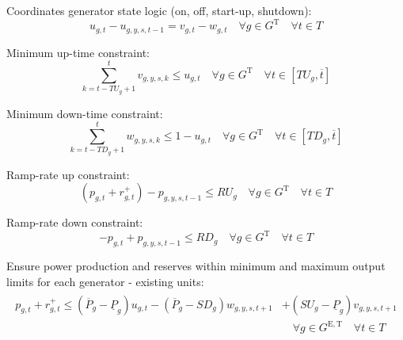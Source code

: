 \documentclass{article}
\newcommand{\sGeneratorsExistingThermal}{G^{\mathrm{E,T}}}
\newcommand{\sGeneratorsThermal}{G^{\mathrm{T}}}
\newcommand{\sIntervals}{T}
\newcommand{\iGenerator}{g}
\newcommand{\iYear}{y}
\newcommand{\iScenario}{s}
\newcommand{\iInterval}{t}
\newcommand{\iIntervalAlias}{k}
\newcommand{\iIntervalTerminal}{\overline{\iInterval}}
\newcommand{\cPowerOutputMax}[1][\iGenerator,\iYear]{\overline{P}_{#1}}
\newcommand{\cUpTimeMin}[1][\iGenerator]{TU_{#1}}
\newcommand{\cDownTimeMin}[1][\iGenerator]{TD_{#1}}
\newcommand{\cRampRateUp}[1][\iGenerator]{RU_{#1}}
\newcommand{\cRampRateDown}[1][\iGenerator]{RD_{#1}}
\newcommand{\cPowerOutputMin}[1][\iGenerator]{\underline{P}_{#1}}
\newcommand{\cRampRateStartup}[1][\iGenerator]{SU_{#1}}
\newcommand{\cRampRateShutdown}[1][\iGenerator]{SD_{#1}}
\newcommand{\vStartupIndicator}[1][\iGenerator,\iInterval]{v_{#1}}
\newcommand{\vShutdownIndicator}[1][\iGenerator,\iInterval]{w_{#1}}
\newcommand{\vReserveUp}[1][\iGenerator,\iInterval]{r^{+}_{#1}}
\newcommand{\vOnIndicator}[1][\iGenerator,\iInterval]{u_{#1}}
\newcommand{\vPower}[1][\iGenerator,\iInterval]{p_{#1}}
\begin{document}
Coordinates generator state logic (on, off, start-up, shutdown):
\begin{equation}
\vOnIndicator - \vOnIndicator[\iGenerator,\iYear,\iScenario,\iInterval-1] = \vStartupIndicator - \vShutdownIndicator \quad \forall \iGenerator \in \sGeneratorsThermal \quad \forall \iInterval \in \sIntervals
\end{equation}

Minimum up-time constraint:
\begin{equation}
\sum\limits_{\iIntervalAlias=\iInterval-\cUpTimeMin + 1}^{\iInterval} \vStartupIndicator[\iGenerator,\iYear,\iScenario,\iIntervalAlias] \leq \vOnIndicator \quad \forall \iGenerator \in \sGeneratorsThermal  \quad \forall \iInterval \in \left[\cUpTimeMin, \iIntervalTerminal \right]
\end{equation}

Minimum down-time constraint:
\begin{equation}
\sum\limits_{\iIntervalAlias=\iInterval-\cDownTimeMin[\iGenerator]+1}^{\iInterval}\vShutdownIndicator[\iGenerator,\iYear,\iScenario,\iIntervalAlias] \leq 1 - \vOnIndicator \quad \forall \iGenerator \in \sGeneratorsThermal  \quad \forall \iInterval \in \left[\cDownTimeMin, \iIntervalTerminal \right]
\end{equation}

Ramp-rate up constraint:
\begin{equation}
\left(\vPower + \vReserveUp\right) - \vPower[\iGenerator,\iYear,\iScenario,\iInterval-1] \leq \cRampRateUp \quad \forall \iGenerator \in \sGeneratorsThermal  \quad \forall \iInterval \in \sIntervals
\end{equation}

Ramp-rate down constraint:
\begin{equation}
- \vPower + \vPower[\iGenerator,\iYear,\iScenario,\iInterval-1] \leq \cRampRateDown \quad \forall \iGenerator \in \sGeneratorsThermal  \quad \forall \iInterval \in \sIntervals
\end{equation}

Ensure power production and reserves within minimum and maximum output limits for each generator - existing units:
\begin{align}
	\begin{split}
	\vPower + \vReserveUp \leq \left(\cPowerOutputMax[\iGenerator] - \cPowerOutputMin\right) \vOnIndicator - \left(\cPowerOutputMax[\iGenerator] -\cRampRateShutdown \right) \vShutdownIndicator[\iGenerator,\iYear,\iScenario,\iInterval+1] & + \left(\cRampRateStartup - \cPowerOutputMin\right)\vStartupIndicator[\iGenerator,\iYear,\iScenario,\iInterval+1]\\
	& \quad \forall \iGenerator \in \sGeneratorsExistingThermal  \quad \forall \iInterval \in \sIntervals\\
	\end{split}
\end{align}
\end{document}
